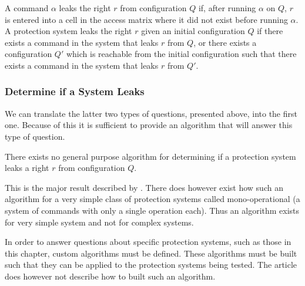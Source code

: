 \begin{definition}
A command $\alpha$ leaks the right $r$ from configuration $Q$ if, after running $\alpha$ on $Q$, $r$ is entered into a cell in the access matrix where it did not exist before running $\alpha$.
A protection system leaks the right $r$ given an initial configuration $Q$ if there exists a command in the system that leaks $r$ from $Q$, or there exists a configuration $Q'$ which is reachable from the initial configuration such that there exists a command in the system that leaks $r$ from $Q'$.
\end{definition}

\subsubsection{Determine if a System Leaks}
We can translate the latter two types of questions, presented above, into the first one.
Because of this it is sufficient to provide an algorithm that will answer this type of question.

\begin{definition}
  There exists no general purpose algorithm for determining if a protection system leaks a right $r$ from configuration $Q$. \Cite{HRU}
\end{definition}

This is the major result described by \citet{HRU}.
There does however exist how such an algorithm for a very simple class of protection systems called mono-operational (a system of commands with only a single operation each).
Thus an algorithm exists for very simple system and not for complex systems.

In order to answer questions about specific protection systems, such as those in this chapter, custom algorithms must be defined.
These algorithms must be built such that they can be applied to the protection systems being tested.
The article does however not describe how to built such an algorithm.
